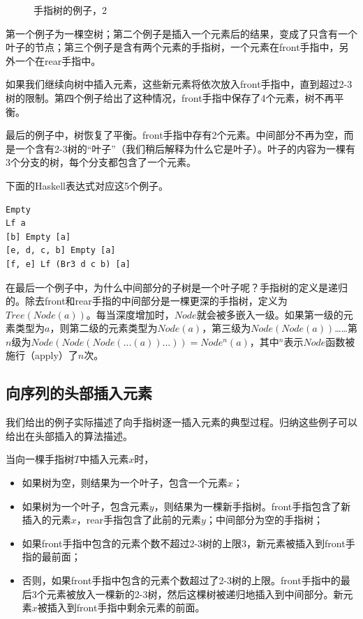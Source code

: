 \documentclass[b5paper]{ctexart}
\begin{document}
\begin{figure}[htbp]
  \centering
  \hspace{0.2\textwidth}
  \caption{手指树的例子，2} \label{fig:ftr-example-2}
\end{figure}

第一个例子为一棵空树；第二个例子是插入一个元素后的结果，变成了只含有一个叶子的节点；第三个例子是含有两个元素的手指树，一个元素在front手指中，另外一个在rear手指中。

如果我们继续向树中插入元素，这些新元素将依次放入front手指中，直到超过2-3树的限制。第四个例子给出了这种情况，front手指中保存了4个元素，树不再平衡。

最后的例子中，树恢复了平衡。front手指中存有2个元素。中间部分不再为空，而是一个含有2-3树的“叶子”（我们稍后解释为什么它是叶子）。叶子的内容为一棵有3个分支的树，每个分支都包含了一个元素。

下面的Haskell表达式对应这5个例子。

\lstset{language=Haskell}
\begin{lstlisting}[style=Haskell]
Empty
Lf a
[b] Empty [a]
[e, d, c, b] Empty [a]
[f, e] Lf (Br3 d c b) [a]
\end{lstlisting}

在最后一个例子中，为什么中间部分的子树是一个叶子呢？手指树的定义是递归的。除去front和rear手指的中间部分是一棵更深的手指树，定义为$Tree(Node(a))$。每当深度增加时，$Node$就会被多嵌入一级。如果第一级的元素类型为$a$，则第二级的元素类型为$Node(a)$，第三级为$Node(Node(a))$……第$n$级为$Node(Node(Node(...(a))...)) = Node^n(a)$，其中$^n$表示$Node$函数被施行（apply）了$n$次。

\subsection{向序列的头部插入元素}

我们给出的例子实际描述了向手指树逐一插入元素的典型过程。归纳这些例子可以给出在头部插入的算法描述。

当向一棵手指树$T$中插入元素$x$时，
\begin{itemize}
\item 如果树为空，则结果为一个叶子，包含一个元素$x$；
\item 如果树为一个叶子，包含元素$y$，则结果为一棵新手指树。front手指包含了新插入的元素$x$，rear手指包含了此前的元素$y$；中间部分为空的手指树；
\item 如果front手指中包含的元素个数不超过2-3树的上限3，新元素被插入到front手指的最前面；
\item 否则，如果front手指中包含的元素个数超过了2-3树的上限。front手指中的最后3个元素被放入一棵新的2-3树，然后这棵树被递归地插入到中间部分。新元素$x$被插入到front手指中剩余元素的前面。
\end{itemize}
\end{document}
